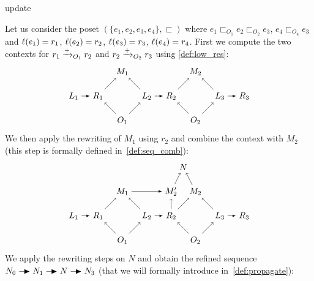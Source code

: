 \begin{example}
\label{ex:e1e2e3}
\begin{mdframed}[backgroundcolor=blue!20]
  update
\end{mdframed}

Let us consider the poset $(\{e_1,e_2,e_3,e_4\},\sqsubset)$ where $e_1\sqsubset_{O_1}e_2\sqsubset_{O_2}e_3$, $e_4\sqsubset_{O_4}e_3$ and $\ell(e_1)=r_1$, $\ell(e_2)=r_2$, $\ell(e_3)=r_3$, $\ell(e_4)=r_4$. First we compute the two contexts for $r_1\mathrel{\xrightarrow{+}}_{O_1} r_2$ and $r_2\mathrel{\xrightarrow{+}}_{O_2} r_3$ using \autoref{def:low_res}:
\[
\begin{tikzpicture} %
  \node (o1) at (0,-1) {\(O_1\)};
  \node (m1) at (0,1) {\(M_1\)};
  \node (r1) at (-1,0) {\(R_1\)};
  \node (l1) at (-2,0) {\(L_1\)};
  \node (l2) at (1,0) {\(L_2\)};
  \node (r2) at (2,0) {\(R_2\)};
  \node (o2) at (3,-1) {\(O_2\)};
  \node (m2) at (3,1) {\(M_2\)};
  \node (l3) at (4,0) {\(L_3\)};
  \node (r3) at (5,0) {\(R_3\)};
  \draw [->] (o1) -- (r1);
  \draw [->] (o1) -- (l2);
  \draw [->] (r1) -- (m1);
  \draw [->] (l2) -- (m1);
  \draw [->] (o2) -- (r2);
  \draw [->] (o2) -- (l3);
  \draw [->] (r2) -- (m2);
  \draw [->] (l3) -- (m2);
  \draw [>=latex, ->] (l1) -- (r1);
  \draw [>=latex, ->] (l2) -- (r2);
  \draw [>=latex, ->] (l3) -- (r3);
\end{tikzpicture}
\]
We then apply the rewriting of $M_1$ using $r_2$ and combine the context with $M_2$ (this step is formally defined in~\autoref{def:seq_comb}):
\[
\begin{tikzpicture} %
  \node (o1) at (0,-1) {\(O_1\)};
  \node (m1) at (0,1) {\(M_1\)};
  \node (r1) at (-1,0) {\(R_1\)};
  \node (l1) at (-2,0) {\(L_1\)};
  \node (l2) at (1,0) {\(L_2\)};
  \node (r2) at (2,0) {\(R_2\)};
  \node (o2) at (3,-1) {\(O_2\)};
  \node (m2) at (3,1) {\(M_2\)};
  \node (l3) at (4,0) {\(L_3\)};
  \node (r3) at (5,0) {\(R_3\)};
  \node (m2p) at (2,1) {\(M_2'\)};
  \node (n) at (2.5,2) {\(N\)};
  \draw [->] (o1) -- (r1);
  \draw [->] (o1) -- (l2);
  \draw [->] (r1) -- (m1);
  \draw [->] (l2) -- (m1);
  \draw [->] (o2) -- (r2);
  \draw [->] (o2) -- (l3);
  \draw [->] (r2) -- (m2);
  \draw [->] (l3) -- (m2);
  \draw [->] (m2) -- (n);
  \draw [->] (m2p) -- (n);
  \draw [->] (r2) -- (m2p);
  \draw [>=latex, ->] (l1) -- (r1);
  \draw [>=latex, ->] (l2) -- (r2);
  \draw [>=latex, ->] (l3) -- (r3);
  \draw [>=latex, ->] (m1) -- (m2p);
\end{tikzpicture}
\]
We apply the rewriting steps on $N$ and obtain the refined sequence $N_0\action N_1\action N\action N_3$ (that we will formally introduce in~\autoref{def:propagate}):

\end{example}
